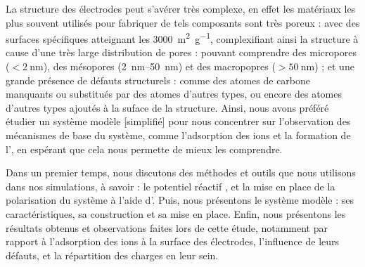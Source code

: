 La structure des électrodes peut s'avérer très complexe\cite{bo_design_2018}\cite{iro_brief_2016}, en effet les matériaux les plus souvent utilisés pour fabriquer de tels composants sont très poreux : avec des surfaces spécifiques atteignant les \qty{3000}{\square \meter \per \gram}, complexifiant ainsi la structure à cause d'une très large distribution de pores : pouvant comprendre des micropores ($< \qty{2}{\nano\meter}$), des mésopores (\qtyrange[range-units = single]{2}{50}{\nano \meter}) et des macropopres ($> \qty{50}{\nano \meter}$) ; et une grande présence de défauts structurels : comme des atomes de carbone manquants ou substitués par des atomes d'autres types, ou encore des atomes d'autres types ajoutés à la suface de la structure.
Ainsi, nous avons préféré étudier un système modèle [simplifié] pour nous concentrer sur l'observation des mécanismes de base du système, comme l'adsorption des ions et la formation de l'\edl{}, en espérant que cela nous permette de mieux les comprendre.

Dans un premier temps, nous discutons des méthodes et outils que nous utilisons dans nos simulations, à savoir : le potentiel réactif \reaxff{}\cite{van_duin_reaxff_2001}\cite{russo_atomistic-scale_2011}\cite{senftle_reaxff_2016}, et la mise en place de la polarisation du système à l'aide d'\echemdid{}\cite{onofrio_voltage_2015}.
Puis, nous présentons le système modèle : ses caractéristiques, sa construction et sa mise en place.
Enfin, nous présentons les résultats obtenus et observations faites lors de cette étude, notamment par rapport à l'adsorption des ions à la surface des électrodes, l'influence de leurs défauts, et la répartition des charges en leur sein.

